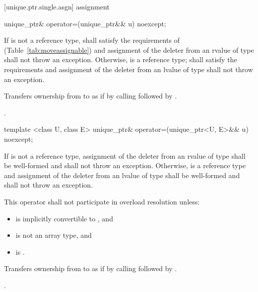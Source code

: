 [unique.ptr.single.asgn]{ assignment}

%
\begin{itemdecl}
unique_ptr& operator=(unique_ptr&& u) noexcept;
\end{itemdecl}

\begin{itemdescr}
\pnum
\requires If  is not a reference type,  shall satisfy the
requirements of  (Table~\ref{tab:moveassignable}) and assignment
of the deleter from an rvalue of type  shall not throw an exception.
Otherwise,  is a reference type;
 shall satisfy the 
requirements and assignment of the deleter from an
lvalue of type  shall not throw an exception.

\pnum
\effects
Transfers ownership from  to  as if by calling
 followed by
.

\pnum
\returns {}.
\end{itemdescr}

%
\begin{itemdecl}
template <class U, class E> unique_ptr& operator=(unique_ptr<U, E>&& u) noexcept;
\end{itemdecl}

\begin{itemdescr}
\pnum
\requires If  is not a reference type, assignment of the deleter from
an rvalue of type  shall be well-formed and shall not throw an exception.
Otherwise,  is a reference type and assignment of the deleter from an lvalue
of type  shall be well-formed and shall not throw an exception.

\pnum
\remarks This operator shall not participate in overload resolution unless:

\begin{itemize}
\item {} is implicitly convertible to , and
\item {} is not an array type, and
\item {} is .
\end{itemize}

\pnum
\effects Transfers ownership from  to  as if by calling
 followed by
.

\pnum
\returns {}.
\end{itemdescr}

